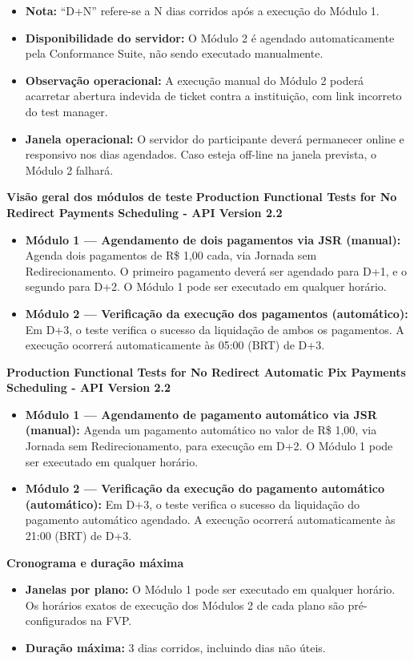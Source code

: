 \begin{itemize}
    \item \textbf{Nota:} ``D+N'' refere-se a N dias corridos após a execução do Módulo 1.
    \item \textbf{Disponibilidade do servidor:} O Módulo 2 é agendado automaticamente pela Conformance Suite, não sendo executado manualmente.
    \item \textbf{Observação operacional:} A execução manual do Módulo 2 poderá acarretar abertura indevida de ticket contra a instituição, com link incorreto do test manager.
    \item \textbf{Janela operacional:} O servidor do participante deverá permanecer online e responsivo nos dias agendados. Caso esteja off-line na janela prevista, o Módulo 2 falhará.
\end{itemize}
\medskip
\textbf{Visão geral dos módulos de teste}
\medskip
\textbf{Production Functional Tests for No Redirect Payments Scheduling - API Version 2.2}
\begin{itemize}
    \item \textbf{Módulo 1 — Agendamento de dois pagamentos via JSR (manual):} Agenda dois pagamentos de R\$ 1,00 cada, via Jornada sem Redirecionamento. O primeiro pagamento deverá ser agendado para D+1, e o segundo para D+2. O Módulo 1 pode ser executado em qualquer horário.
    
    \item \textbf{Módulo 2 — Verificação da execução dos pagamentos (automático):} Em D+3, o teste verifica o sucesso da liquidação de ambos os pagamentos. A execução ocorrerá automaticamente às 05:00 (BRT) de D+3.
\end{itemize}
\medskip
\textbf{Production Functional Tests for No Redirect Automatic Pix Payments Scheduling - API Version 2.2}
\begin{itemize}
    \item \textbf{Módulo 1 — Agendamento de pagamento automático via JSR (manual):} Agenda um pagamento automático no valor de R\$ 1,00, via Jornada sem Redirecionamento, para execução em D+2. O Módulo 1 pode ser executado em qualquer horário.
    \item \textbf{Módulo 2 — Verificação da execução do pagamento automático (automático):} Em D+3, o teste verifica o sucesso da liquidação do pagamento automático agendado. A execução ocorrerá automaticamente às 21:00 (BRT) de D+3.
\end{itemize}
\medskip
\textbf{Cronograma e duração máxima}

\begin{itemize}
    \item \textbf{Janelas por plano:} O Módulo 1 pode ser executado em qualquer horário. Os horários exatos de execução dos Módulos 2 de cada plano são pré-configurados na FVP.
    \item \textbf{Duração máxima:} 3 dias corridos, incluindo dias não úteis.
\end{itemize}

